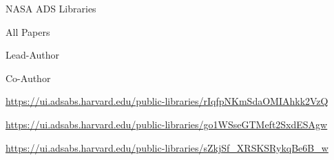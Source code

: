 \documentclass[cv.tex]{subfiles}
\begin{document}
\begin{center}
\end{center}
{\color{themecolor} \large NASA ADS Libraries}
\par\noindent
\parbox{0.18\textwidth}{%
	\small\raggedleft
	All Papers \par
	Lead-Author \par
	Co-Author \par
}
\hspace{1mm}
\parbox{0.8\textwidth}{%
	\small\vspace{1mm}
	\url{https://ui.adsabs.harvard.edu/public-libraries/rIqfpNKmSdaOMIAhkk2VzQ}
	\par
	\url{https://ui.adsabs.harvard.edu/public-libraries/go1WSseGTMeft2SxdESAgw}
	\par
	\url{https://ui.adsabs.harvard.edu/public-libraries/sZkjSf_XRSKSRykqBe6B_w}
}
\end{document}
